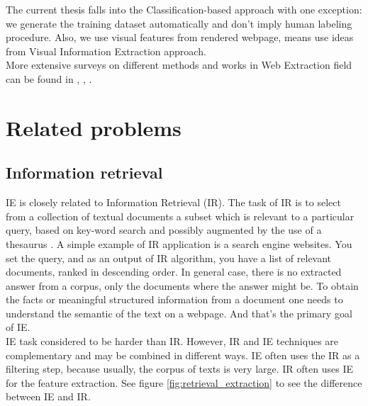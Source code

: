 The current thesis falls into the Classification-based approach with one exception: we generate the training dataset automatically and don't imply human labeling procedure. Also, we use visual features from rendered webpage, means use ideas from Visual Information Extraction approach.\\  

More extensive surveys on different methods and works in Web Extraction field can be found in \cite{WebExtraSurveyFerrara},  \cite{Trends}, \cite{WebDataSurvey}.

\section{Related problems}

\subsection{Information retrieval}

IE is closely related to Information Retrieval (IR). The task of IR is to select from a collection of textual documents a subset which is relevant to a particular query, based on key-word search and possibly augmented by the use of a thesaurus \cite{InfExtr}. A simple example of IR application is a search engine websites. You set the query, and as an output of IR algorithm, you have a list of relevant documents, ranked in descending order. In general case, there is no extracted answer from a corpus, only the documents where the answer might be. To obtain the facts or meaningful structured information from a document one needs to understand the semantic of the text on a webpage. And that's the primary goal of IE.\\

IE task considered to be harder than IR. However, IR and IE techniques are complementary and may be combined in different ways. IE often uses the IR as a filtering step, because usually, the corpus of texts is very large. IR often uses IE for the feature extraction. See figure \ref{fig:retrieval_extraction} to see the difference between IE and IR.\\

